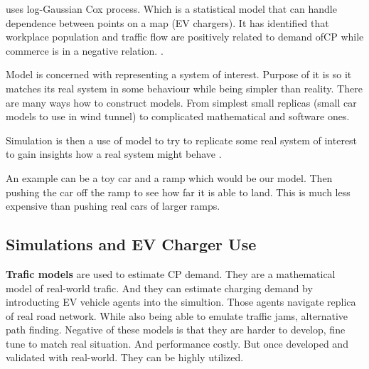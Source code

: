  uses log-Gaussian Cox process. Which is a statistical model that can handle dependence between points on a map (EV chargers). It has identified that workplace population and traffic flow are positively related to demand of\acrfull{CP} while commerce is in a negative relation. .

\begin{kaobox}[frametitle=Simulation vs Model]
    Model is concerned with representing a system of interest. Purpose of it is so it matches its real system in some behaviour while being simpler than reality. There are many ways how to construct models. From simplest small replicas (small car models to use in wind tunnel) to complicated mathematical and software ones.

    Simulation is then a use of model to try to replicate some real system of interest to gain insights how a real system might behave .

    An example can be a toy car and a ramp which would be our model. Then pushing the car off the ramp to see how far it is able to land. This is much less expensive than pushing real cars of larger ramps.

    \cite{maria1997introduction}
\end{kaobox}

\subsection{Simulations and EV Charger Use}

\textbf{Trafic models} are used to estimate \acrfull{CP} demand. They are a mathematical model of real-world trafic. And they can estimate charging demand by introducting EV vehicle agents into the simultion. Those agents navigate replica of real road network. While also being able to emulate traffic jams, alternative path finding. Negative of these models is that they are harder to develop, fine tune to match real situation. And performance costly. But once developed and validated with real-world. They can be highly utilized.

